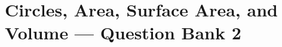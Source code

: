 \documentclass[12pt, fleqn, openany, oneside]{studyGuide}
\begin{document}

\chapter{Circles, Area, Surface Area, and Volume — Question Bank 2}












\printAnswerKey
\end{document}
